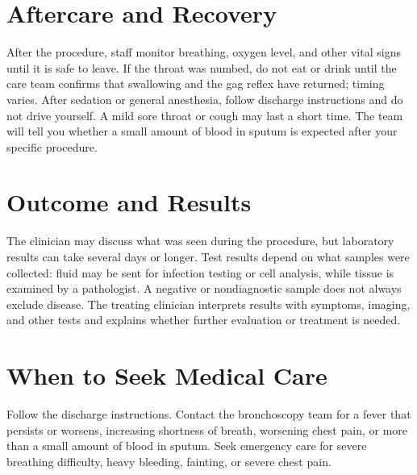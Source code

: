 \section*{Aftercare and Recovery}
After the procedure, staff monitor breathing, oxygen level, and other vital signs until it is safe to leave. If the throat was numbed, do not eat or drink until the care team confirms that swallowing and the gag reflex have returned; timing varies. After sedation or general anesthesia, follow discharge instructions and do not drive yourself. A mild sore throat or cough may last a short time. The team will tell you whether a small amount of blood in sputum is expected after your specific procedure.

\section*{Outcome and Results}
The clinician may discuss what was seen during the procedure, but laboratory results can take several days or longer. Test results depend on what samples were collected: fluid may be sent for infection testing or cell analysis, while tissue is examined by a pathologist. A negative or nondiagnostic sample does not always exclude disease. The treating clinician interprets results with symptoms, imaging, and other tests and explains whether further evaluation or treatment is needed.

\section*{When to Seek Medical Care}
Follow the discharge instructions. Contact the bronchoscopy team for a fever that persists or worsens, increasing shortness of breath, worsening chest pain, or more than a small amount of blood in sputum. Seek emergency care for severe breathing difficulty, heavy bleeding, fainting, or severe chest pain.

